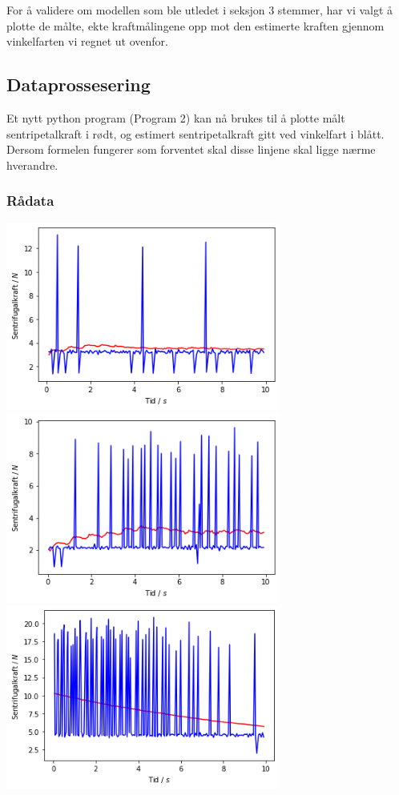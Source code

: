 \documentclass{article}
\begin{document}
For å validere om modellen som ble utledet i seksjon 3 stemmer, har vi valgt å plotte de målte, ekte kraftmålingene opp mot den estimerte kraften 
gjennom vinkelfarten vi regnet ut ovenfor.

\subsection{Dataprossesering}
Et nytt python program (Program 2) kan nå brukes til å plotte målt sentripetalkraft i rødt, 
og estimert sentripetalkraft gitt ved vinkelfart i blått. Dersom formelen fungerer som 
forventet skal disse linjene skal ligge nærme hverandre.

\subsubsection{Rådata}

\begin{center}
    \includegraphics[width=9cm]{data_300_10.png} \\
    \includegraphics[width=9cm]{data_200_10.png} \\
    \includegraphics[width=9cm]{data_300_14.png}
\end{center}
\end{document}
